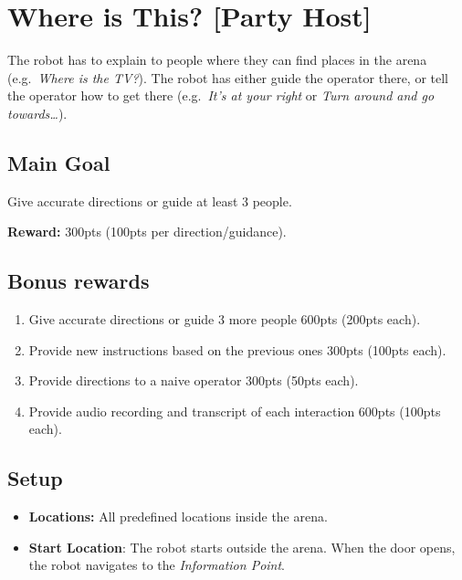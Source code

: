 \section{Where is This? [Party Host]}
\label{test:where-is-this}
The robot has to explain to people where they can find places in the arena (e.g.~\emph{Where is the TV?}). The robot has either guide the operator there, or tell the operator how to get there (e.g.~\emph{It's at your right} or \emph{Turn around and go towards\dots}).


\subsection*{Main Goal}
Give accurate directions or guide at least 3 people.

\noindent\textbf{Reward:} 300pts (100pts per direction/guidance).

\subsection*{Bonus rewards}
\begin{enumerate}[nosep]
	\item Give accurate directions or guide 3 more people 600pts (200pts each).
	\item Provide new instructions based on the previous ones 300pts (100pts each).
	\item Provide directions to a naive operator 300pts (50pts each).
	\item Provide audio recording and transcript of each interaction 600pts (100pts each).
\end{enumerate}

\subsection*{Setup}
\begin{itemize}[nosep]
	\item \textbf{Locations:} All predefined locations inside the arena.

	\item \textbf{Start Location}: The robot starts outside the arena. When the door opens, the robot navigates to the \emph{Information Point}.
\end{itemize}

